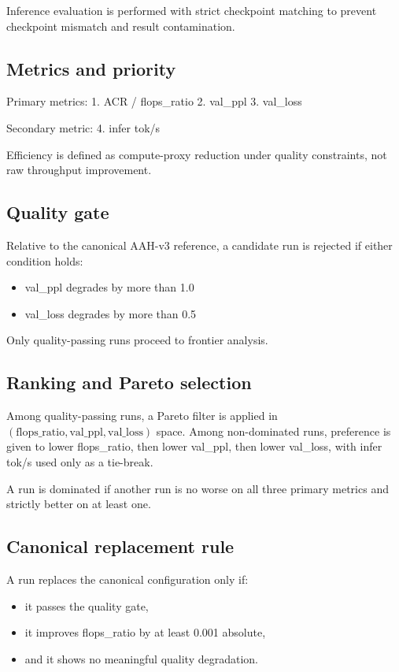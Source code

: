 \documentclass[11pt]{article}
\begin{document}
Inference evaluation is performed with strict checkpoint matching to prevent checkpoint mismatch and result contamination.

\subsection{Metrics and priority}

Primary metrics:
	1.	ACR / flops_ratio
	2.	val_ppl
	3.	val_loss

Secondary metric:
4. infer tok/s

Efficiency is defined as compute-proxy reduction under quality constraints, not raw throughput improvement.

\subsection{Quality gate}

Relative to the canonical AAH-v3 reference, a candidate run is rejected if either condition holds:
\begin{itemize}
\item val_ppl degrades by more than 1.0%
\item val_loss degrades by more than 0.5%
\end{itemize}

Only quality-passing runs proceed to frontier analysis.

\subsection{Ranking and Pareto selection}

Among quality-passing runs, a Pareto filter is applied in $(\text{flops_ratio}, \text{val_ppl}, \text{val_loss})$ space. Among non-dominated runs, preference is given to lower flops_ratio, then lower val_ppl, then lower val_loss, with infer tok/s used only as a tie-break.

A run is dominated if another run is no worse on all three primary metrics and strictly better on at least one.

\subsection{Canonical replacement rule}

A run replaces the canonical configuration only if:
\begin{itemize}
\item it passes the quality gate,
\item it improves flops_ratio by at least 0.001 absolute,
\item and it shows no meaningful quality degradation.
\end{itemize}
\end{document}
